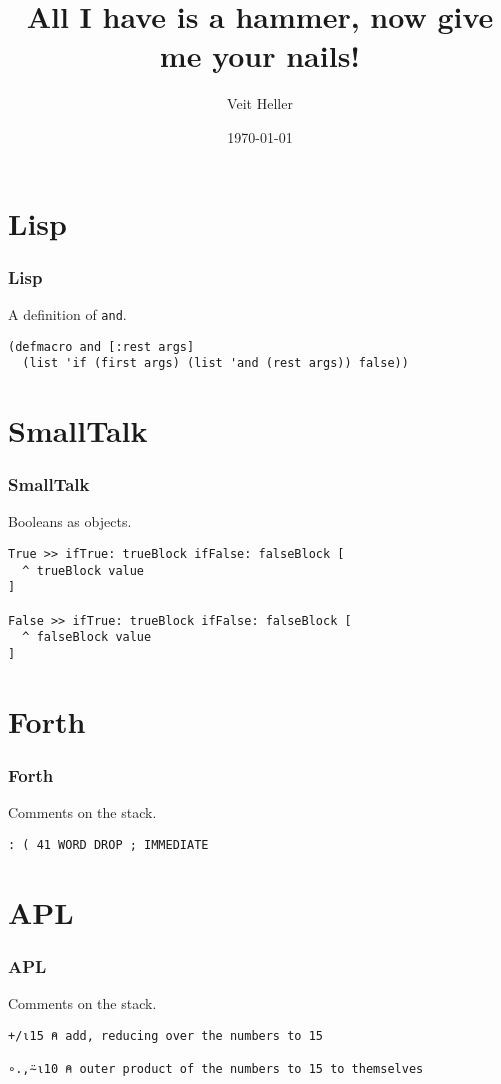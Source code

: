 \documentclass[aspectratio=169]{beamer}
\title{All I have is a hammer, now give me your nails!}
\date{\today}
\author{Veit Heller}
\institute{EnthusiastiCon 2020}
\begin{document}
  \maketitle
  \section{Lisp}
  \begin{frame}[fragile]
    \frametitle{Lisp}
    \begin{listing}[H]
      \caption{A definition of \texttt{and}.}
      \begin{verbatim}
(defmacro and [:rest args]
  (list 'if (first args) (list 'and (rest args)) false))
      \end{verbatim}
    \end{listing}
  \end{frame}
  \section{SmallTalk}
  \begin{frame}[fragile]
    \frametitle{SmallTalk}
    \begin{listing}[H]
      \caption{Booleans as objects.}
      \begin{verbatim}
True >> ifTrue: trueBlock ifFalse: falseBlock [
  ^ trueBlock value
]

False >> ifTrue: trueBlock ifFalse: falseBlock [
  ^ falseBlock value
]
      \end{verbatim}
    \end{listing}
  \end{frame}
  \section{Forth}
  \begin{frame}[fragile]
    \frametitle{Forth}
    \begin{listing}[H]
      \caption{Comments on the stack.}
      \begin{verbatim}
: ( 41 WORD DROP ; IMMEDIATE
      \end{verbatim}
    \end{listing}
  \end{frame}
  \section{APL}
  \begin{frame}[fragile]
    \frametitle{APL}
    \begin{listing}[H]
      \caption{Comments on the stack.}
      \begin{verbatim}
+/⍳15 ⍝ add, reducing over the numbers to 15

∘.,⍨⍳10 ⍝ outer product of the numbers to 15 to themselves
      \end{verbatim}
    \end{listing}
  \end{frame}
\end{document}
